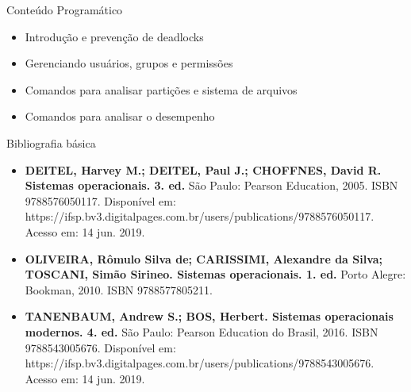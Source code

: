 \documentclass{beamer}
\begin{document}
  \begin{frame}{Conteúdo Programático}
      \begin{itemize}
         
          \item Introdução e prevenção de deadlocks
          \item Gerenciando usuários, grupos e permissões
          \item Comandos para analisar partições e sistema de arquivos
          \item Comandos para analisar o desempenho
      \end{itemize}
  \end{frame}

\begin{frame}{Bibliografia básica}\justifying
      \begin{itemize}
            \item \textbf{DEITEL, Harvey M.; DEITEL, Paul J.; CHOFFNES, David R.\textcolor{sintefdarkgreen}{ Sistemas operacionais. 3. ed.}} São Paulo: Pearson Education, 2005. ISBN 9788576050117. Disponível em: https://ifsp.bv3.digitalpages.com.br/users/publications/9788576050117. Acesso em: 14 jun. 2019.

            \item \textbf{OLIVEIRA, Rômulo Silva de; CARISSIMI, Alexandre da Silva; TOSCANI, Simão Sirineo.\textcolor{sintefdarkgreen}{ Sistemas operacionais. 1. ed.}} Porto Alegre: Bookman, 2010. ISBN 9788577805211.
        
            \item \textbf{TANENBAUM, Andrew S.; BOS, Herbert.\textcolor{sintefdarkgreen}{ Sistemas operacionais modernos. 4. ed.}} São Paulo: Pearson Education do Brasil, 2016. ISBN 9788543005676. Disponível em: https://ifsp.bv3.digitalpages.com.br/users/publications/9788543005676. Acesso em: 14 jun. 2019.
        
      \end{itemize}
\end{frame}
      
\end{document}
